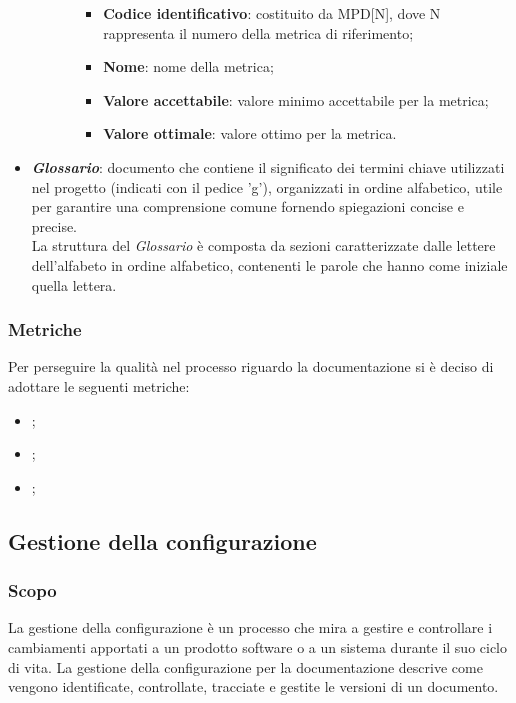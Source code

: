 \begin{itemize}
\begin{itemize}
\begin{itemize}
                                    \begin{itemize}
                                          \item \textbf{Codice identificativo}: costituito da MPD[N], dove N rappresenta il numero della metrica di riferimento;
                                          \item \textbf{Nome}: nome della metrica;
                                          \item \textbf{Valore accettabile}: valore minimo accettabile per la metrica;
                                          \item \textbf{Valore ottimale}: valore ottimo per la metrica.
                                    \end{itemize}
                        \end{itemize}
            \end{itemize}
      \item \textit{\textbf{Glossario}}: documento che contiene il significato dei termini chiave utilizzati nel progetto (indicati con il pedice 'g'), organizzati in ordine alfabetico, utile per garantire una comprensione comune fornendo spiegazioni concise e precise.
            \\La struttura del \textit{Glossario} è composta da sezioni caratterizzate dalle lettere dell'alfabeto in ordine alfabetico, contenenti le parole che hanno come iniziale quella lettera.
\end{itemize}

\subsubsection{Metriche}
Per perseguire la qualità nel processo riguardo la documentazione si è deciso
di adottare le seguenti metriche:
\begin{itemize}
      \item {};
      \item {};
      \item {};
\end{itemize}

\subsection{Gestione della configurazione}
\subsubsection{Scopo}
La gestione della configurazione è un processo che mira a gestire e controllare
i cambiamenti apportati a un prodotto software o a un sistema durante il suo
ciclo di vita. La gestione della configurazione per la documentazione descrive
come vengono identificate, controllate, tracciate e gestite le versioni di un
documento.
